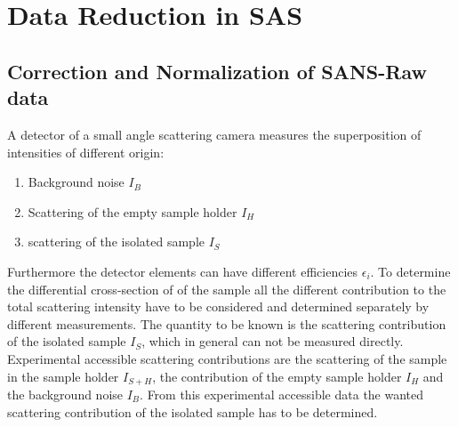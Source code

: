 \chapter{Data Reduction in SAS}

\section{Correction and Normalization of SANS-Raw data}

A detector of a small angle scattering camera measures the
superposition of intensities of different origin:
\begin{enumerate}
\item Background noise $I_B$
\item Scattering of the empty sample holder $I_{H}$
\item scattering of the isolated sample $I_S$
\end{enumerate}
Furthermore the detector elements can have different efficiencies $\epsilon_i$.
To determine the differential cross-section of of the sample all the different
contribution to the total scattering intensity have to be considered and determined
separately by different measurements. The quantity to be known is the scattering
contribution of the isolated sample $I_S$, which in general can not be measured directly.
Experimental accessible scattering contributions are the scattering of the sample in the
sample holder $I_{S+H}$, the contribution of the empty sample holder $I_{H}$ and the
background noise $I_B$. From this experimental accessible data the wanted scattering
contribution of the isolated sample has to be determined.

